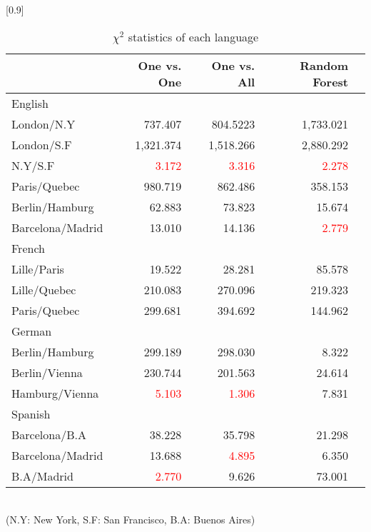 \documentclass[twocolumn]{article}
\begin{document}
\begin{table}[ht]
	\caption{$\chi^2$ statistics of each language}
	\scalebox{0.8}[0.9]{
	\begin{tabular}{|l|r|r|r|r|} \hline
	{}&One vs. One&One vs. All&Random Forest\\ \hline \hline
	English&{} & {} & {} \\ \hline
	London/N.Y& 737.407 & 804.5223 &1,733.021 \\
	London/S.F& 1,321.374 &1,518.266& 2,880.292\\
	N.Y/S.F & \textcolor{red}{3.172}&\textcolor{red}{3.316}&\textcolor{red}{2.278} \\
	Paris/Quebec & 980.719& 862.486& 358.153\\
	Berlin/Hamburg & 62.883 & 73.823 & 15.674 \\
	Barcelona/Madrid & 13.010& 14.136 & \textcolor{red}{2.779} \\ \hline

	French &{} & {} & {} \\ \hline
	Lille/Paris & 19.522 &28.281& 85.578\\
	Lille/Quebec & 210.083 &270.096& 219.323\\
	Paris/Quebec & 299.681 &394.692& 144.962\\ \hline

	German &{} & {} & {} \\\hline
	Berlin/Hamburg& 299.189 &298.030&8.322 \\
	Berlin/Vienna& 230.744&201.563& 24.614\\
	Hamburg/Vienna& \textcolor{red}{5.103} &\textcolor{red}{1.306}& 7.831\\ \hline

	Spanish&{} & {} & {} \\\hline
	Barcelona/B.A& 38.228 & 35.798 & 21.298 \\
	Barcelona/Madrid & 13.688 & \textcolor{red}{4.895} & 6.350\\
	B.A/Madrid& \textcolor{red}{2.770} & 9.626 & 73.001\\ \hline

	\end{tabular}
	}
	\label{tab:result_chi_square}
	\\(N.Y: New York, S.F: San Francisco,  B.A: Buenos Aires)
\end{table}
\end{document}
